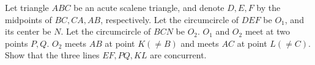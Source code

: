 Let triangle $ABC$ be an acute scalene triangle, and denote $D,E,F$ by the midpoints of $BC,CA,AB$, respectively. Let the circumcircle of $DEF$ be $O_1$, and its center be $N$. Let the circumcircle of $BCN$ be $O_2$. $O_1$ and $O_2$ meet at two points $P, Q$. $O_2$ meets $AB$ at point $K(\neq B)$ and meets $AC$ at point $L(\neq C)$. Show that the three lines $EF,PQ,KL$ are concurrent.